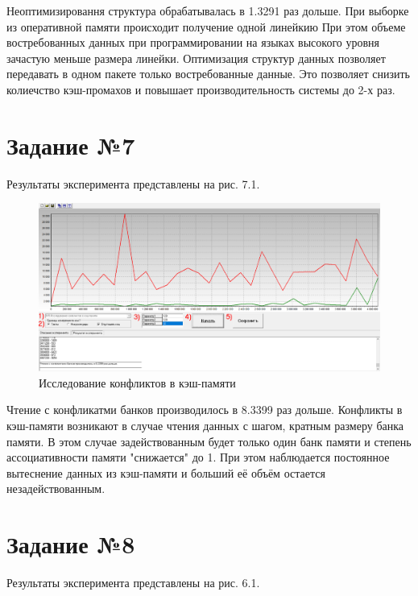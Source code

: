 Неоптимизировання структура обрабатывалась в 1.3291 раз дольше. При выборке из оперативной памяти происходит получение одной линейкию При этом объеме востребованных данных при программировании на языках высокого уровня зачастую меньше размера линейки. Оптимизация структур данных позволяет передавать в одном пакете только востребованные данные. Это позволяет снизить колиечство кэш-промахов и повышает производительность системы до 2-х раз.

\chapter{Задание №7}

Результаты эксперимента представлены на рис. 7.1.

\begin{figure}[H]
	\begin{center}
		\includegraphics[scale=0.5]{assets/task7.png}
	\end{center}
	\caption{Исследование конфликтов в кэш-памяти}
\end{figure}

Чтение с конфликатми банков производилось в 8.3399 раз дольше. Конфликты в кэш-памяти возникают в случае чтения данных с шагом, кратным размеру банка памяти. В этом случае задействованным будет только один банк памяти и степень ассоциативности памяти "снижается" до 1. При этом наблюдается постоянное вытеснение данных из кэш-памяти и больший её объём остается незадействованным.

\chapter{Задание №8}

Результаты эксперимента представлены на рис. 6.1.

